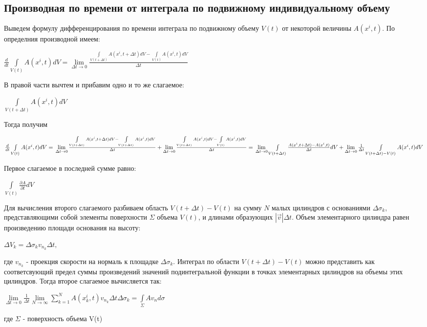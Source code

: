 \subsection{Производная по времени от интеграла по подвижному индивидуальному объему}
Выведем формулу дифференцирования по времени интеграла по подвижному объему $V(t)$ от некоторой величины $A(x^i, t)$. По определния производной имеем:
\begin{center}$
\frac{d}{dt} \int\limits_{V(t)} A(x^i,t) dV =
\lim\limits_{\Delta t \to 0} \frac{\int\limits_{V(t + \Delta t)} A(x^i,t + \Delta t)dV - \int\limits_{V(t)}A(x^i,t)dV}{\Delta t}
$\end{center}
В правой части вычтем и прибавим одно и то же слагаемое:
\begin{center}$
\int\limits_{V(t + \Delta t)} A(x^i, t)dV
$\end{center}
Тогда получим
\begin{center}$
\frac{d}{dt} \int\limits_{V(t)} A(x^i,t) dV
=\newline
\lim\limits_{\Delta t \to 0} \frac{\int\limits_{V(t + \Delta t)} A(x^i,t + \Delta t)dV - \int\limits_{V(t + \Delta t)}A(x^i,t)dV}{\Delta t}
+
\lim\limits_{\Delta t \to 0} \frac{\int\limits_{V(t + \Delta t)} A(x^i,t)dV - \int\limits_{V(t)}A(x^i,t)dV}{\Delta t}
=\newline
\lim\limits_{\Delta t \to 0}\int\limits_{V(t + \Delta t)} \frac{A(x^i, t + \Delta t) - A(x^i, t)}{\Delta t}dV
+
\lim\limits_{\Delta t \to 0}\frac{1}{\Delta t}\int\limits_{V(t + \Delta t) - V(t)}A(x^i, t)dV
$\end{center}
Первое слагаемое в последней сумме равно:
\begin{center}$
\int\limits_{V(t)}\frac{\partial A}{\partial t}dV
$\end{center}
Для вычисления второго слагаемого разбиваем область $V(t + \Delta t) - V(t)$ на сумму $N$ малых цилиндров с основаниями $\Delta \sigma_k$, представляющими собой элементы поверхности $\Sigma$ объема $V(t)$, и длинами образующих $|\Vec{v}|\Delta
t$. Объем элементарного цилиндра равен произведению площади основания на высоту:
\begin{center}$
\Delta V_k = \Delta \sigma_k v_{n_k} \Delta t,
$\end{center}
где $v_{n_k}$ - проекция скорости на нормаль к площадке $\Delta \sigma_k$. Интеграл по области $V(t + \Delta t) - V(t)$ можно представить как соответсвующий предел суммы произведений значений подинтегральной функции в точках элементарных цилиндров на объемы этих цилиндров. Тогда второе слагаемое вычисляется так:
\begin{center}$
\lim\limits_{\Delta t \to 0} \frac{1}{\Delta t}\lim\limits_{N \to \infty}\sum_{k=1}^{N}A(x_k^i,t)v_{n_k}\Delta t \Delta \sigma_k
=
\int\limits_{\Sigma}Av_n d\sigma
$\end{center}
где $\Sigma$ - поверхность объема V(t)

